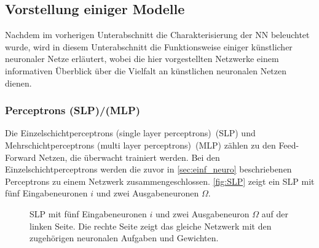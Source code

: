 \subsection{Vorstellung einiger Modelle}\label{sec:ANN-Modelle}
Nachdem im vorherigen Unterabschnitt die Charakterisierung der NN beleuchtet wurde, wird in diesem Unterabschnitt die Funktionsweise einiger künstlicher neuronaler Netze erläutert, wobei die hier vorgestellten Netzwerke einem informativen Überblick über die Vielfalt an künstlichen neuronalen Netzen dienen.


\subsubsection{Perceptrons (SLP)/(MLP)}
Die Einzelschichtperceptrons (single layer perceptrons)~(\gls{SLP}) und Mehrschichtperceptrons (multi layer perceptrons)~(\gls{MLP}) zählen zu den Feed-Forward Netzen, die überwacht trainiert werden. Bei den Einzelschichtperceptrons werden die zuvor in \autoref{sec:einf_neuro} beschriebenen Perceptrons zu einem Netzwerk zusammengeschlossen. \autoref{fig:SLP} zeigt ein SLP mit fünf Eingabeneuronen $i$ und zwei Ausgabeneuronen $\Omega$.



\begin{figure}[!htb]
    \centering
        
    \caption[Darstellung eines SLP]{SLP mit fünf Eingabeneuronen $i$ und zwei Ausgabeneuron $\Omega$ auf der linken Seite. Die rechte Seite zeigt das gleiche Netzwerk mit den zugehörigen neuronalen Aufgaben und Gewichten.\,\protect\footnotemark{}}
    \label{fig:SLP}
\end{figure}
\addtocounter{footnote}{-1}     %
\addtocounter{Hfootnote}{-1}    %
\wrapfigfoot{}


